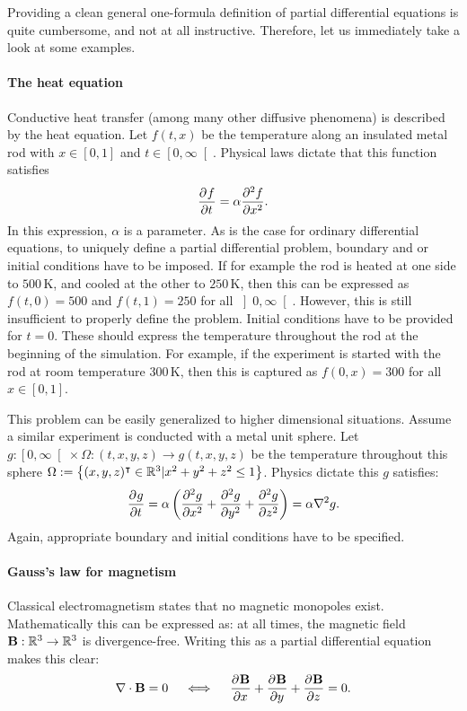 Providing a clean general one-formula definition of partial differential equations is quite cumbersome, and not at all instructive. Therefore, let us immediately take a look at some examples.

\paragraph{The heat equation} Conductive heat transfer (among many other diffusive phenomena) is described by the heat equation. Let $f(t, x)$ be the temperature along an insulated metal rod with $x \in [0, 1]$ and $t \in \left[0, \infty\right[$. Physical laws dictate that this function satisfies
$$
    {\pdv[]{f}{t}} = \alpha \pdv[2]{f}{x}\text{.}
$$
In this expression, $\alpha$ is a parameter. As is the case for ordinary differential equations, to uniquely define a partial differential problem, boundary and or initial conditions have to be imposed. If for example the rod is heated at one side to $500\,\text{K}$, and cooled at the other to $250\,\text{K}$, then this can be expressed as $f(t, 0) = 500$ and $f(t, 1)=250$ for all $\left]0, \infty\right[$. However, this is still insufficient to properly define the problem. Initial conditions have to be provided for $t=0$. These should express the temperature throughout the rod at the beginning of the simulation. For example, if the experiment is started with the rod at room temperature $300\,\text{K}$, then this is captured as $f(0, x) = 300$ for all $x \in [0, 1]$.

This problem can be easily generalized to higher dimensional situations. Assume a similar experiment is conducted with a metal unit sphere. Let $g : \left[0, \infty\right[ \times \Omega : (t, x, y, z) \to g(t, x, y, z)$ be the temperature throughout this sphere $\Omega := \left\{(x, y, z)^\intercal \in \mathbb{R}^3 | x^2 + y^2 + z^2 \leq 1\right\}$. Physics dictate this $g$ satisfies:
$$
{\pdv[]{g}{t}} = \alpha\left(\pdv[2]{g}{x} + \pdv[2]{g}{y} + \pdv[2]{g}{z}\right) = \alpha \nabla^2 g \text{.}
$$
Again, appropriate boundary and initial conditions have to be specified.

\paragraph{Gauss's law for magnetism} Classical electromagnetism states that no magnetic monopoles exist. Mathematically this can be expressed as: at all times, the magnetic field $\vb{B} : \mathbb{R}^3 \to \mathbb{R}^3$ is divergence-free. Writing this as a partial differential equation makes this clear:
\begin{equation}\label{equ:c1_gauss_magnets}
    \nabla \cdot \vb{B} = 0 \quad\iff\quad \pdv[]{\vb{B}}{x} + \pdv[]{\vb{B}}{y} + \pdv[]{\vb{B}}{z} = 0\text{.}    
\end{equation}

